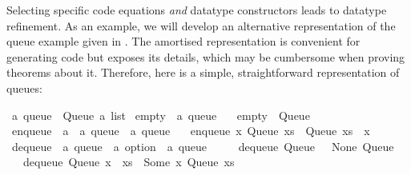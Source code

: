 \begin{isabellebody}
\isamarkuptrue%
%
\endisatagquote
{\isafoldquote}%
%
\isadelimquote
%
\endisadelimquote
%
\isamarkuptrue%
%
\begin{isamarkuptext}%
Selecting specific code equations \emph{and} datatype constructors
  leads to datatype refinement.  As an example, we will develop an
  alternative representation of the queue example given in
  .  The amortised representation is
  convenient for generating code but exposes its 
  details, which may be cumbersome when proving theorems about it.
  Therefore, here is a simple, straightforward representation of
  queues:%
\end{isamarkuptext}%
\isamarkuptrue%
%
\isadelimquote
%
\endisadelimquote
%
\isatagquote
{}\isamarkupfalse%
\ {\isacharprime}a\ queue\ {\isacharequal}\ Queue\ {\isachardoublequoteopen}{\isacharprime}a\ list{\isachardoublequoteclose}\isanewline
\isanewline
{}\isamarkupfalse%
\ empty\ {\isacharcolon}{\isacharcolon}\ {\isachardoublequoteopen}{\isacharprime}a\ queue{\isachardoublequoteclose}\ \isanewline
\ \ {\isachardoublequoteopen}empty\ {\isacharequal}\ Queue\ {\isacharbrackleft}{\isacharbrackright}{\isachardoublequoteclose}\isanewline
\isanewline
{}\isamarkupfalse%
\ enqueue\ {\isacharcolon}{\isacharcolon}\ {\isachardoublequoteopen}{\isacharprime}a\ {\isasymRightarrow}\ {\isacharprime}a\ queue\ {\isasymRightarrow}\ {\isacharprime}a\ queue{\isachardoublequoteclose}\ \isanewline
\ \ {\isachardoublequoteopen}enqueue\ x\ {\isacharparenleft}Queue\ xs{\isacharparenright}\ {\isacharequal}\ Queue\ {\isacharparenleft}xs\ {\isacharat}\ {\isacharbrackleft}x{\isacharbrackright}{\isacharparenright}{\isachardoublequoteclose}\isanewline
\isanewline
{}\isamarkupfalse%
\ dequeue\ {\isacharcolon}{\isacharcolon}\ {\isachardoublequoteopen}{\isacharprime}a\ queue\ {\isasymRightarrow}\ {\isacharprime}a\ option\ {\isasymtimes}\ {\isacharprime}a\ queue{\isachardoublequoteclose}\ \isanewline
\ \ \ \ {\isachardoublequoteopen}dequeue\ {\isacharparenleft}Queue\ {\isacharbrackleft}{\isacharbrackright}{\isacharparenright}\ {\isacharequal}\ {\isacharparenleft}None{\isacharcomma}\ Queue\ {\isacharbrackleft}{\isacharbrackright}{\isacharparenright}{\isachardoublequoteclose}\isanewline
\ \ {\isacharbar}\ {\isachardoublequoteopen}dequeue\ {\isacharparenleft}Queue\ {\isacharparenleft}x\ {\isacharhash}\ xs{\isacharparenright}{\isacharparenright}\ {\isacharequal}\ {\isacharparenleft}Some\ x{\isacharcomma}\ Queue\ xs{\isacharparenright}{\isachardoublequoteclose}%

\end{isabellebody}
